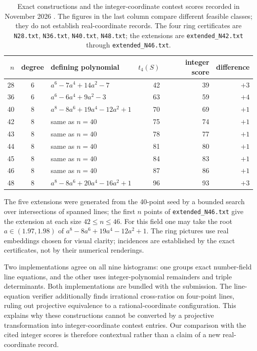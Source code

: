 \documentclass[11pt,a4paper]{amsart}
\theoremstyle{remark}\newtheorem{remark}[theorem]{Remark}
\begin{document}
\begin{table}[ht]
\centering\small
\begin{tabular}{rclrrr}
\toprule
$n$ & degree & defining polynomial & $t_4(S)$ & integer score & difference\\
\midrule
28 & 6 & $a^6-7a^4+14a^2-7$ & 42 & 39 & $+3$\\
36 & 6 & $a^6-6a^4+9a^2-3$ & 63 & 59 & $+4$\\
40 & 8 & $a^8-8a^6+19a^4-12a^2+1$ & 70 & 69 & $+1$\\
42 & 8 & same as $n=40$ & 75 & 74 & $+1$\\
43 & 8 & same as $n=40$ & 78 & 77 & $+1$\\
44 & 8 & same as $n=40$ & 81 & 80 & $+1$\\
45 & 8 & same as $n=40$ & 84 & 83 & $+1$\\
46 & 8 & same as $n=40$ & 87 & 86 & $+1$\\
48 & 8 & $a^8-8a^6+20a^4-16a^2+1$ & 96 & 93 & $+3$\\
\bottomrule
\end{tabular}
\caption{Exact constructions and the integer-coordinate contest scores recorded in November 2026 \cite{Contest}. The figures in the last column compare different feasible classes; they do not establish real-coordinate records. The four ring certificates are \texttt{N28.txt}, \texttt{N36.txt}, \texttt{N40.txt}, \texttt{N48.txt}; the extensions are \texttt{extended\_N42.txt} through \texttt{extended\_N46.txt}.}\label{tab:fields}
\end{table}



The five extensions were generated from the 40-point seed by a bounded search over intersections of spanned lines; the first $n$ points of \texttt{extended\_N46.txt} give the extension at each size $42\le n\le46$. For this field one may take the root $a\in(1.97,1.98)$ of $a^8-8a^6+19a^4-12a^2+1$. The ring pictures use real embeddings chosen for visual clarity; incidences are established by the exact certificates, not by their numerical renderings.

Two implementations agree on all nine histograms: one groups exact number-field line equations, and the other uses integer-polynomial remainders and triple determinants. Both implementations are bundled with the submission. The line-equation verifier additionally finds irrational cross-ratios on four-point lines, ruling out projective equivalence to a rational-coordinate configuration. This explains why these constructions cannot be converted by a projective transformation into integer-coordinate contest entries. Our comparison with the cited integer scores is therefore contextual rather than a claim of a new real-coordinate record.
\end{document}
